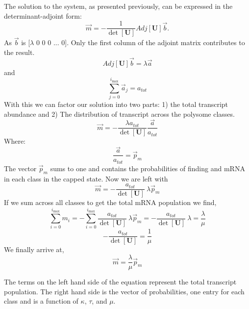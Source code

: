 \documentclass[a4,center,fleqn]{NAR}
\newcommand{\imax}{\ensuremath{{i_{\max}}}\xspace}
\let\bs\boldsymbol
\begin{document}
The solution to the system, as presented previously, can be expressed in the determinant-adjoint form:
	\begin{equation*}
		\vec{m}=-\frac{1}{\det[\bs{U}]}Adj[\bs{U}]\vec{b}.
	\end{equation*}
As $\vec{b}$ is [$\lambda$ 0 0 0 ... 0]. Only the first column of the adjoint matrix contributes to the result. 
	\begin{equation*}
		Adj[\bs{U}]\vec{b} = \lambda\vec{a}
	\end{equation*}	
and
	\begin{equation*}
		\sum_{j=0}^{\imax}\vec{a}_j = a_{tot} 
	\end{equation*}
With this we can factor our solution into two parts: 1) the total transcript abundance and 2) The distribution of transcript across the polysome classes.
	\begin{equation*}
		\vec{m}=-\frac{\lambda a_{tot}}{\det[\bs{U}]} \frac{\vec{a}}{a_{tot}} 
	\end{equation*}
Where:
	\begin{equation*}
		\frac{\vec{a}}{a_{tot}} = \vec{p}_m
	\end{equation*}
The vector $\vec{p}_m$ sums to one and contains the probabilities of finding and mRNA in each class in the capped state. Now we are left with
	\begin{equation*}
		\vec{m}=-\frac{a_{tot}}{\det[\bs{U}]} \: \lambda\vec{p}_m
	\end{equation*}
If we sum across all classes to get the total mRNA population we find,
	\begin{equation*}
		\sum_{i=0}^{\imax}m_{i} =-\sum_{i=0}^{\imax} \frac{a_{tot}}{\det[\bs{U}]} \: \lambda\vec{p}_m =-\frac{a_{tot}}{\det[\bs{U}]} \: \lambda = \frac{\lambda}{\mu}
	\end{equation*}
	\begin{equation*}
		-\frac{a_{tot}}{\det[\bs{U}]} = \frac{1}{\mu}
	\end{equation*}
We finally arrive at,
	\begin{equation} 
		\vec{m}=\frac{\lambda}{\mu}\vec{p}_m
	\end{equation}


The terms on the left hand side of the equation represent the total transcript population. The right hand side is the vector of probabilities, one entry for each class and is a function of $\kappa$, $\tau$, and $\mu$.	



%

\end{document}
